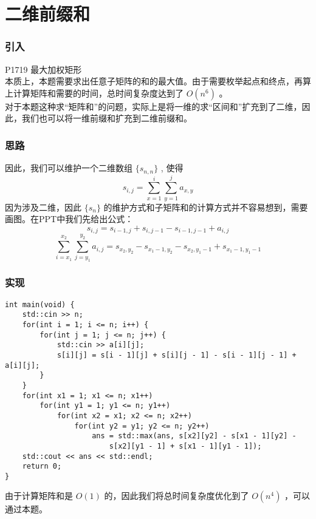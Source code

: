 \documentclass{beamer}
\begin{document}
\section{二维前缀和}
\begin{frame}
\frametitle{引入}
P1719 最大加权矩形 \\ 
本质上，本题需要求出任意子矩阵的和的最大值。由于需要枚举起点和终点，再算上计算矩阵和需要的时间，总时间复杂度达到了 $O(n^6)$ 。\\ 
对于本题这种求“矩阵和”的问题，实际上是将一维的求“区间和”扩充到了二维，因此，我们也可以将一维前缀和扩充到二维前缀和。
\end{frame}
\begin{frame}
\frametitle{思路}
因此，我们可以维护一个二维数组 $\{s_{n, n}\}$ , 使得
$$s_{i, j} = \sum_{x = 1}^{i}\sum_{y = 1}^{j}a_{x, y}$$ 
因为涉及二维，因此 $\{s_n\}$ 的维护方式和子矩阵和的计算方式并不容易想到，需要画图。在PPT中我们先给出公式：
$$s_{i, j} = s_{i - 1, j} + s_{i, j - 1} - s_{i - 1, j - 1} + a_{i, j}$$
$$\sum_{i = x_1}^{x_2}\sum_{j = y_1}^{y_2}a_{i, j} = s_{x_2, y_2} - s_{x_1 - 1, y_2} - s_{x_2, y_1 - 1} + s_{x_1 - 1, y_1 - 1}$$
\end{frame}
\begin{frame}[fragile]
\frametitle{实现}
\begin{onlyenv}
\begin{verbatim}
int main(void) {
    std::cin >> n;
    for(int i = 1; i <= n; i++) {
        for(int j = 1; j <= n; j++) {
            std::cin >> a[i][j];
            s[i][j] = s[i - 1][j] + s[i][j - 1] - s[i - 1][j - 1] + a[i][j];
        }
    }
    for(int x1 = 1; x1 <= n; x1++)
        for(int y1 = 1; y1 <= n; y1++)
            for(int x2 = x1; x2 <= n; x2++)
                for(int y2 = y1; y2 <= n; y2++)
                    ans = std::max(ans, s[x2][y2] - s[x1 - 1][y2] - 
                        s[x2][y1 - 1] + s[x1 - 1][y1 - 1]);
    std::cout << ans << std::endl;
    return 0;
}
\end{verbatim}
\end{onlyenv}
由于计算矩阵和是 $O(1)$ 的，因此我们将总时间复杂度优化到了 $O(n^4)$ ，可以通过本题。
\end{frame}
\end{document}
